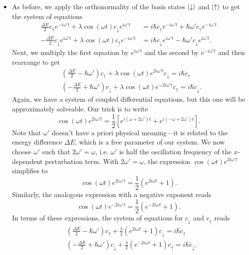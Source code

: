 \documentclass[11pt, a4paper]{article}
\newcommand{\ua}{\uparrow}  %
\newcommand{\da}{\downarrow}  %
\begin{document}
\begin{itemize}
    \item As before, we apply the orthonormality of the basis states $ \ket{\da} $ and $ \ket{\ua} $ to get the system of equations
	\begin{align*}
        \frac{\Delta E}{2}c_{\ua}e^{-i\omega't} + \lambda \cos (\omega t) c_{\da}e^{i\omega't} &= i\hbar \dot{c}_{\ua}e^{-i\omega't} + \hbar \omega' c_{\ua}e^{-i\omega't}\\
         -\frac{\Delta E}{2}c_{\da}e^{i\omega't} + \lambda \cos (\omega t) c_{\ua}e^{-i\omega't} &= i\hbar \dot{c}_{\da}e^{i\omega't} - \hbar \omega' c_{\da}e^{i\omega't}.
	\end{align*}
	Next, we multiply the first equation by $ e^{i\omega' t} $ and the second by $ e^{-i\omega' t} $  and then rearrange to get
	\begin{align*}
        &\left(\frac{\Delta E}{2} - \hbar \omega' \right) c_{\ua} + \lambda \cos (\omega t) e^{2i\omega't}c_{\da} = i\hbar \dot{c}_{\ua}\\
        &\left(-\frac{\Delta E}{2} + \hbar \omega' \right) c_{\da} + \lambda \cos (\omega t) e^{-2i\omega't}c_{\ua} = i\hbar \dot{c}_{\da}.
	\end{align*}
	Again, we have a system of coupled differential equations, but this one will be approximately solveable. Our trick is to write
	\begin{equation*}
        \cos (\omega t) e^{2i\omega't} = \frac{1}{2}\left[e^{i(\omega + 2\omega')t} + e^{i(-\omega + 2\omega')t}\right].
	\end{equation*}
    Note that $ \omega' $ doesn't have a priori physical meaning---it is related to the energy difference $ \Delta E $, which is a free parameter of our system. We now choose $ \omega' $ such that $ 2 \omega' = \omega $, i.e. $ \omega' $ is half the oscillation frequency of the $ x $-dependent perturbation term. With $ 2 \omega' = \omega $, the expression $ \cos (\omega t) e^{2i\omega't}$ simplifies to
	\begin{equation*}
        \cos (\omega t) e^{2i\omega't} = \frac{1}{2}(e^{2i\omega t} + 1).
	\end{equation*}
	Similarly, the analogous expression with a negative exponent reads
	\begin{equation*}
        \cos (\omega t) e^{-2i\omega't} = \frac{1}{2}(e^{-2i\omega t} + 1).
	\end{equation*}
    In terms of these expressions, the system of equations for $ c_{\da} $ and $ c_{\ua} $ reads
	\begin{align*}
        &\left(\frac{\Delta E}{2} - \hbar \omega' \right) c_{\ua} +  \frac{\lambda}{2}(e^{2i\omega t} + 1) c_{\da} = i\hbar \dot{c}_{\ua}\\
        &\left(-\frac{\Delta E}{2} + \hbar \omega' \right) c_{\da} +  \frac{\lambda}{2}(e^{-2i\omega t} + 1)c_{\ua} = i\hbar \dot{c}_{\da}.
	\end{align*}
	

\end{itemize}
\end{document}
